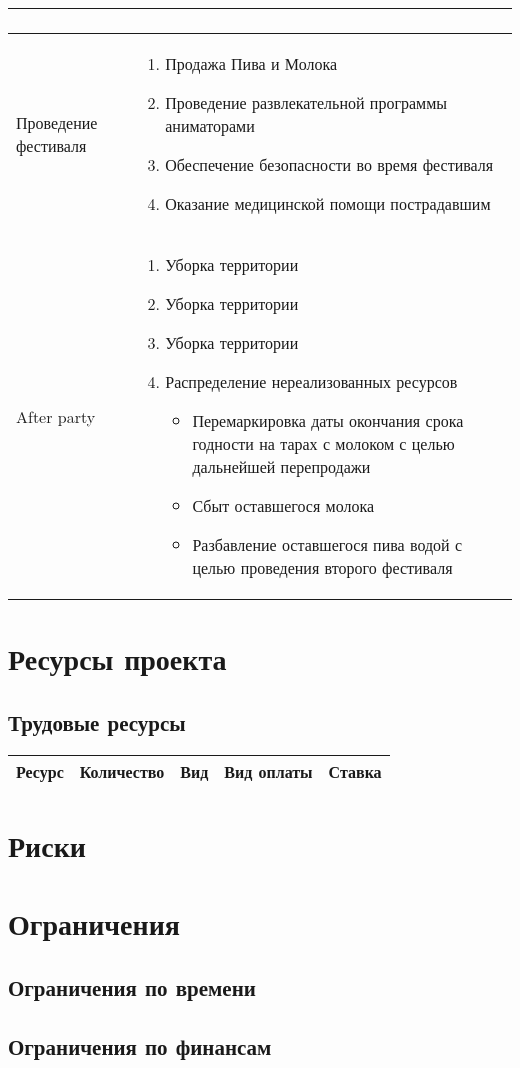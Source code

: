 \documentclass[a4paper,12pt]{article}
\begin{document}
\begin{center}
\begin{longtable}{|p{3cm}|p{11cm}|}
\begin{enumerate}
  \end{enumerate} \\
  \hline
  Проведение фестиваля &
  \begin{enumerate}
    \item Продажа Пива и Молока
    \item Проведение развлекательной программы аниматорами
    \item Обеспечение безопасности во время фестиваля
    \item Оказание медицинской помощи пострадавшим
  \end{enumerate} \\
  \hline
  After party & 
  \begin{enumerate}
    \item Уборка территории
    \item Уборка территории
    \item Уборка территории
    \item Распределение нереализованных ресурсов
      \begin{itemize}
        \item Перемаркировка даты окончания срока годности на тарах с молоком с целью дальнейшей перепродажи
        \item Сбыт оставшегося молока
        \item Разбавление оставшегося пива водой с целью проведения второго фестиваля
      \end{itemize}
  \end{enumerate}\\
  \hline
\end{longtable}
\end{center}
\section{Ресурсы проекта}
\subsection{Трудовые ресурсы}
\begin{tabular}{|l|c|l|l|l|}
  \hline
  Ресурс & Количество & Вид & Вид оплаты & Ставка \\
  \hline
\end{tabular}
\section{Риски}
\section{Ограничения}
\subsection{Ограничения по времени}
\subsection{Ограничения по финансам}
\end{document}
